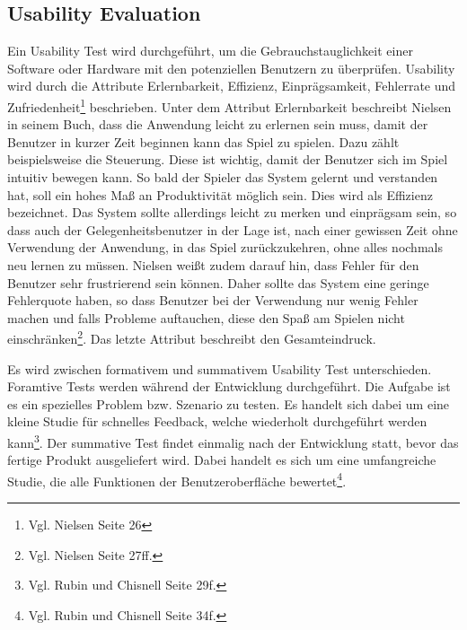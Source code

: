 	\subsection{Usability Evaluation}
		Ein Usability Test wird durchgeführt, um die Gebrauchstauglichkeit einer Software oder Hardware mit den potenziellen Benutzern zu überprüfen. Usability wird durch die Attribute Erlernbarkeit, Effizienz, Einprägsamkeit, Fehlerrate und Zufriedenheit\footnote{Vgl. Nielsen \cite{NielsenUI} Seite 26} beschrieben. Unter dem Attribut Erlernbarkeit beschreibt Nielsen in seinem Buch, dass die Anwendung leicht zu erlernen sein muss, damit der Benutzer in kurzer Zeit beginnen kann das Spiel zu spielen. Dazu zählt beispielsweise die Steuerung. Diese ist wichtig, damit der Benutzer sich im Spiel intuitiv bewegen kann. So bald der Spieler das System gelernt und verstanden hat, soll ein hohes Maß an Produktivität möglich sein. Dies wird als Effizienz bezeichnet. Das System sollte allerdings leicht zu merken und einprägsam sein, so dass auch der Gelegenheitsbenutzer in der Lage ist, nach einer gewissen Zeit ohne Verwendung der Anwendung, in das Spiel zurückzukehren, ohne alles nochmals neu lernen zu müssen. Nielsen weißt zudem darauf hin, dass Fehler für den Benutzer sehr frustrierend sein können. Daher sollte das System eine geringe Fehlerquote haben, so dass Benutzer bei der Verwendung nur wenig Fehler machen und falls Probleme auftauchen, diese den Spaß am Spielen nicht einschränken\footnote{Vgl. Nielsen \cite{NielsenUI} Seite 27ff.}. Das letzte Attribut beschreibt den Gesamteindruck.
		
		Es wird zwischen formativem und summativem Usability Test unterschieden. Foramtive Tests werden während der Entwicklung durchgeführt. Die Aufgabe ist es ein spezielles Problem bzw. Szenario zu testen. Es handelt sich dabei um eine kleine Studie für schnelles Feedback, welche wiederholt durchgeführt werden kann\footnote{Vgl. Rubin und Chisnell \cite{handbookUsability} Seite 29f.}. Der summative Test findet einmalig nach der Entwicklung statt, bevor das fertige Produkt ausgeliefert wird. Dabei handelt es sich um eine umfangreiche Studie, die alle Funktionen der Benutzeroberfläche bewertet\footnote{Vgl. Rubin und Chisnell \cite{handbookUsability} Seite 34f.}.
		

